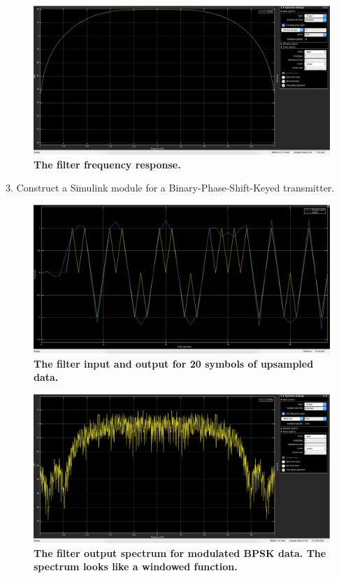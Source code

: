 \documentclass[letterpaper,12pt]{article}
\begin{document}
\begin{figure}[hbtp]
\includegraphics[width=1.0\columnwidth]{prelab1-filter-impulse-spectrum}
\caption{
\label{fig:prelab1-filter-impulse-spectrum}
{\bf The filter frequency response.
}
}
\end{figure}

3. Construct a Simulink module for a Binary-Phase-Shift-Keyed transmitter.

\begin{figure}[hbtp]
\includegraphics[width=1.0\columnwidth]{prelab1-filter-input-output}
\caption{
\label{fig:prelab1-filter-input-output}
{\bf The filter input and output for 20 symbols of upsampled data.
}
}
\end{figure}

\begin{figure}[hbtp]
\includegraphics[width=1.0\columnwidth]{prelab1-filter-output-spectrum}
\caption{
\label{fig:prelab1-filter-output-spectrum}
{\bf The filter output spectrum for modulated BPSK data. The spectrum looks
like a windowed function.
}
}
\end{figure}
\end{document}

